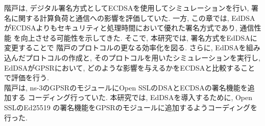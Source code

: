 \indent 階戸は, デジタル署名方式としてECDSAを使用してシミュレーションを行い, 
署名に関する計算負荷と通信への影響を評価していた. 
一方, この章では, EdDSAがECDSAよりもセキュリティと処理時間において優れた署名方式であり, 通信性能
を向上させる可能性を示してきた. そこで, 本研究では, 署名方式をEdDSAに変更することで
階戸のプロトコルの更なる効率化を図る. さらに, EdDSAを組み込んだプロトコルの作成と, 
そのプロトコルを用いたシミュレーションを実行し, EdDSAがGPSRにおいて, 
どのような影響を与えるかをECDSAと比較することで評価を行う. \\
\indent 階戸は, ns-3のGPSRのモジュールにOpen SSLのDSAとECDSAの署名機能を追加する
コーディング行っていた. 本研究では, EdDSAを導入するために, Open SSLのEd25519
\cite{openssl-eddsa}の署名機能をGPSRのモジュールに追加するようコーディングを行った. \\